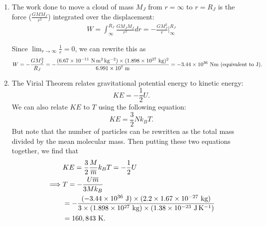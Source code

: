 \documentclass[11pt,letterpaper]{article}
\begin{document}
\begin{enumerate}[label=(\alph*)]
    \item The work done to move a cloud of mass $M_J$ from $r=\infty$ to $r=R_J$ is the force ($\frac{GMM_J}{r^2}$) integrated over the displacement:
        \begin{align*}
            W = \int_{\infty}^{R_J} \frac{GM_JM_J}{r^2}dr = -\frac{GM_J^2}{r} \Big |_{\infty}^{R_J}
        \end{align*}

        Since $\displaystyle\lim_{r\to\infty}\frac{1}{r} = 0$, we can rewrite this as
        \begin{equation*}
            W = -\frac{GM_J^2}{R_J} \\
              = -\frac{(6.67\times 10^{-11}~{\rm N\,m^2\,kg^{-2}})\times (1.898\times 10^{27}~{\rm kg})^2}{6.991 \times 10^{7}~{\rm m}} \\
              = -3.44\times 10^{36}~{\rm Nm \text{ (equivalent to J)}}.
        \end{equation*}

    \item The Virial Theorem relates gravitational potential energy to kinetic energy:
        \begin{equation*}
            KE = -\frac{1}{2}U.
        \end{equation*}
        We can also relate $KE$ to $T$ using the following equation: 
        \begin{equation*}
            KE = \frac{3}{2}Nk_B T.
        \end{equation*}
        But note that the number of particles can be rewritten as the total mass divided by the mean molecular mass. Then putting these two equations together, we find that
        \begin{alignat*}{2}
            &KE = \frac{3}{2}\frac{M}{\overline{m}}k_B T = -\frac{1}{2}U \\
            \implies &T = -\frac{U\overline{m}}{3Mk_B} \\
                     & = -\frac{(-3.44\times 10^{36}~{\rm J})\times (2.2\times 1.67\times 10^{-27}~{\rm kg})}{3\times (1.898\times 10^{27}~{\rm kg})\times (1.38\times 10^{-23}~{\rm J\,K^{-1}})} \\
                     &= 160,843~{\rm K}.
        \end{alignat*}




\end{enumerate}
\end{document}
